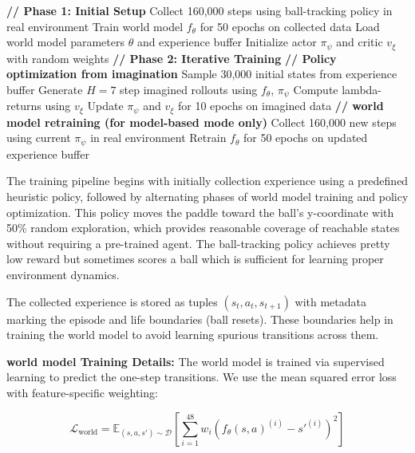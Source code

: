 \documentclass[
	english,
	ruledheaders=section,
	class=report,
	thesis={type=master},
	accentcolor=9c,
	custommargins=true,
	marginpar=false,
	parskip=half-,
	fontsize=11pt,
	pdfa=true,
]{tudapub}
\newcommand{\worldmodel}{world model}
\begin{document}
\begin{algorithm}
	\caption{Complete Training Pipeline}
	\begin{algorithmic}[1]
		\STATE \textbf{// Phase 1: Initial Setup}
		\STATE Collect 160,000 steps using ball-tracking policy in real environment
		\STATE Train \worldmodel{} $f_\theta$ for 50 epochs on collected data
		\ENDIF
		\STATE Load \worldmodel{} parameters $\theta$ and experience buffer
		\STATE Initialize actor $\pi_\psi$ and critic $v_\xi$ with random weights
		\STATE
		\STATE \textbf{// Phase 2: Iterative Training}
		\STATE \textbf{// Policy optimization from imagination}
		\STATE Sample 30,000 initial states from experience buffer
		\STATE Generate $H=7$ step imagined rollouts using $f_\theta$, $\pi_\psi$
		\STATE Compute lambda-returns using $v_\xi$
		\STATE Update $\pi_\psi$ and $v_\xi$ for 10 epochs on imagined data
		\STATE
		\STATE \textbf{// \worldmodel{} retraining (for model-based mode only)}
		\STATE Collect 160,000 new steps using current $\pi_\psi$ in real environment
		\STATE Retrain $f_\theta$ for 50 epochs on updated experience buffer
		\ENDIF
		\ENDFOR
	\end{algorithmic}
\end{algorithm}

The training pipeline begins with initially collection experience using a predefined
heuristic policy, followed by alternating phases of \worldmodel{}
training and policy optimization. This policy moves the paddle toward the
ball's y-coordinate with 50\% random exploration, which provides reasonable
coverage of reachable states without requiring a pre-trained agent. The
ball-tracking policy achieves pretty low reward but sometimes scores a ball
which is sufficient for learning proper environment dynamics.

The collected experience is stored as tuples $(s_t, a_t, s_{t+1})$ with
metadata marking the episode and life boundaries (ball resets). These
boundaries help in training the \worldmodel{} to avoid learning spurious
transitions across them.

\textbf{\worldmodel{} Training Details:} The \worldmodel{} is trained via supervised learning to predict the one-step transitions. We use the mean squared error loss with feature-specific weighting:

\begin{equation}
	\mathcal{L}_{\text{world}} = \mathbb{E}_{(s,a,s') \sim \mathcal{D}}\left[\sum_{i=1}^{48} w_i \left(f_\theta(s, a)^{(i)} - s'^{(i)}\right)^2\right]
\end{equation}
\end{document}
